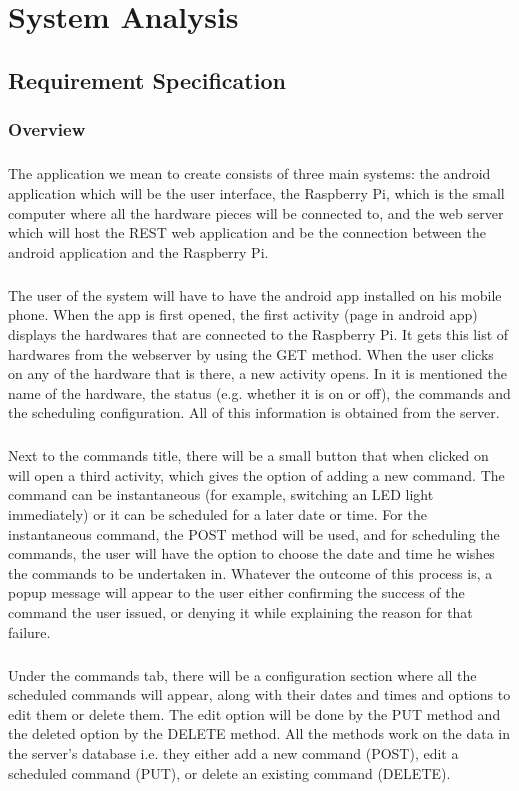 \documentclass[12pt, oneside, a4paper]{book}
\newcommand{\mychapter}[1]{\newpage%
	\thispagestyle{empty}
	\topskip0pt%
	\vspace*{\fill}%
	\addtocounter{chapter}{1}%
	\begin{center}%
		\textbf{\Large{\color{section}{CHAPTER NO. \thechapter \\ \uppercase{#1}}}}%
	\end{center}%
	\vspace*{\fill}%
	\addtocounter{chapter}{-1}
	\newpage%
	\chapter{#1}
}
\begin{document}
	\mychapter{System Analysis}
		\section{Requirement Specification}
			\subsection{Overview}
				\paragraph{} The application we mean to create consists of three main systems: the android application which will be the user interface, the Raspberry Pi, which is the small computer where all the hardware pieces will be connected to, and the web server which will host the REST web application and be the connection between the android application and the Raspberry Pi.
				\paragraph{}The user of the system will have to have the android app installed on his mobile phone. When the app is first opened, the first activity (page in android app) displays the hardwares that are connected to the Raspberry Pi. It gets this list of hardwares from the webserver by using the GET method. When the user clicks on any of the hardware that is there, a new activity opens. In it is mentioned the name of the hardware, the status (e.g. whether it is on or off), the commands and the scheduling configuration. All of this information is obtained from the server. 
				\paragraph{}Next to the commands title, there will be a small button that when clicked on will open a third activity, which gives the option of adding a new command. The command can be instantaneous (for example, switching an LED light immediately) or it can be scheduled for a later date or time. For the instantaneous command, the POST method will be used, and for scheduling the commands, the user will have the option to choose the date and time he wishes the commands to be undertaken in. Whatever the outcome of this process is, a popup message will appear to the user either confirming the success of the command the user issued, or denying it while explaining the reason for that failure.
				\paragraph{}Under the commands tab, there will be a  configuration 	section where all the scheduled commands will appear, along with their dates and times and options to edit them or delete them. The edit option will be done by the PUT method and the deleted option by the DELETE method. All the methods work on the data in the server’s database i.e. they either add a new command (POST), edit a scheduled command (PUT), or delete an existing command (DELETE). 
\end{document}
